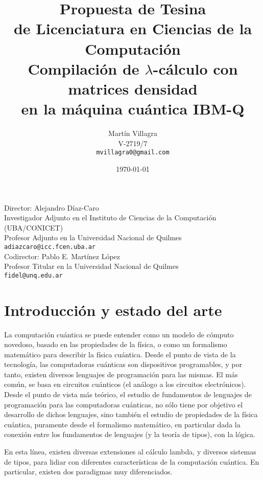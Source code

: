 \documentclass[a4paper]{article}
\title{
  {\normalsize\sc Propuesta de Tesina\\ de Licenciatura en Ciencias de la
    Computación}\\
  Compilación de $\lambda$-cálculo con matrices densidad\\
  en la máquina cuántica IBM-Q
}
\author{
  Martín Villagra\\
  V-2719/7\\
  {\tt mvillagra0@gmail.com}
}
\date{\today}
\begin{document}
\maketitle
\noindent  Director: Alejandro Díaz-Caro\\
Investigador Adjunto en el Instituto de Ciencias de la Computación
(UBA/CONICET)\\
Profesor Adjunto en la Universidad Nacional de Quilmes\\
{\tt adiazcaro@icc.fcen.uba.ar}\\[1ex]
Codirector: Pablo E. Martínez López\\
Profesor Titular en la Universidad Nacional de Quilmes\\
{\tt fidel@unq.edu.ar}

\section*{Introducción y estado del arte}
La computación cuántica se puede entender como un modelo de cómputo novedoso,
basado en las propiedades de la física, o como un formalismo matemático para
describir la física cuántica. Desde el punto de vista de la tecnología, las
computadoras cuánticas son dispositivos programables, y por tanto, existen
diversos lenguajes de programación para las mismas. El más común, se basa en
circuitos cuánticos (el análogo a los circuitos electrónicos). Desde el punto de
vista más teórico, el estudio de fundamentos de lenguajes de programación para
las computadoras cuánticas, no sólo tiene por objetivo el desarrollo de dichos
lenguajes, sino también el estudio de propiedades de la física cuántica,
puramente desde el formalismo matemático, en particular dada la conexión entre
los fundamentos de lenguajes (y la teoría de tipos), con la lógica.

En esta línea, existen diversas extensiones al cálculo lambda, y diversos
sistemas de tipos, para lidiar con diferentes características de la computación
cuántica. En particular, existen dos paradigmas muy diferenciados.
\end{document}
